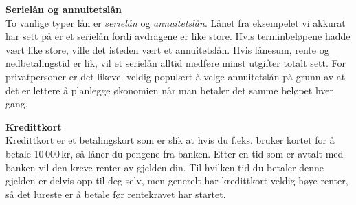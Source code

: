 \textbf{Serielån og annuitetslån}\\
To vanlige typer lån er \textit{serielån} og \textit{annuitetslån}. Lånet fra eksempelet vi akkurat har sett på er et serielån fordi avdragene er like store. Hvis terminbeløpene hadde vært like store, ville det isteden vært et annuitetslån. Hvis lånesum, rente og nedbetalingstid er lik, vil et serielån alltid medføre minst utgifter totalt sett. For privatpersoner er det likevel veldig populært å velge annuitetslån på grunn av at det er lettere å planlegge økonomien når man betaler det samme beløpet hver gang. \vsk

\textbf{Kredittkort}\\
Kredittkort er et betalingskort som er slik at hvis du f.eks. bruker kortet for å betale 10\,000\,kr, så låner du pengene fra banken. Etter en tid som er avtalt med banken vil den kreve renter av gjelden din. Til hvilken tid du betaler denne gjelden er delvis opp til deg selv, men generelt har kredittkort veldig høye renter, så det lureste er å betale før rentekravet har startet.
\regv
{}
\newpage
